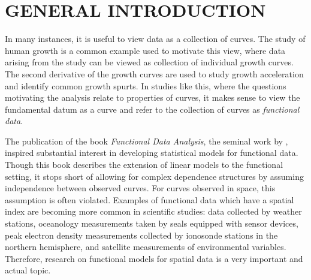 
\section{GENERAL INTRODUCTION}
In many instances, it is useful to view data as a collection of curves. The study of human growth is a common example used to motivate this view, where data arising from the study can be viewed as collection of individual growth curves.  The second derivative of the growth curves are used to study growth acceleration and identify common growth spurts. In studies like this, where the questions motivating the analysis relate to properties of curves, it makes sense to view the fundamental datum as a curve and refer to the collection of curves as \emph{functional data}.  %

The publication of the book \emph{Functional Data Analysis}, the seminal work by \cite{FDA}, inspired substantial interest in developing statistical models for functional data.  Though this book describes the extension of linear models to the functional setting, it stops short of allowing for complex dependence structures by assuming independence between observed curves. For curves observed in space, this assumption is often violated. Examples of functional data which have a spatial index are becoming more common in scientific studies: data collected by weather stations, oceanology measurements taken by seals equipped with sensor devices, peak electron density measurements collected by ionosonde stations in the northern hemisphere, and satellite measurements of environmental variables. Therefore,  research on functional models for spatial data is a very important and actual topic.


